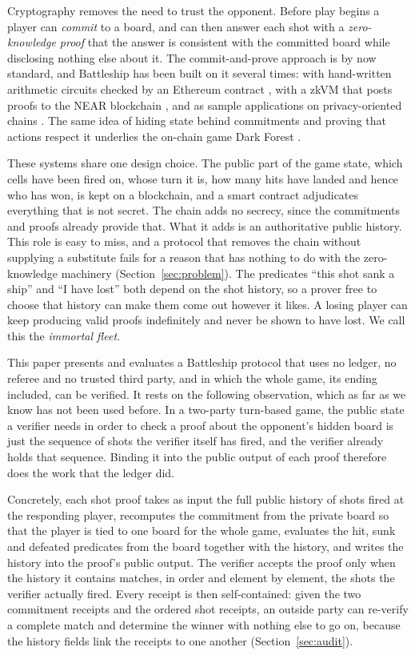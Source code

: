 \documentclass[11pt,a4paper]{article}
\begin{document}
Cryptography removes the need to trust the opponent. Before play begins a player
can \emph{commit} to a board, and can then answer each shot with a
\emph{zero-knowledge proof} that the answer is consistent with the committed
board while disclosing nothing else about it. The commit-and-prove approach is
by now standard, and Battleship has been built on it several times: with
hand-written arithmetic circuits checked by an Ethereum contract
\cite{battlezips,mit6857}, with a zkVM that posts proofs to the NEAR blockchain
\cite{risc0battleship}, and as sample applications on privacy-oriented chains
\cite{aleobattleship,minabattleship}. The same idea of hiding state behind
commitments and proving that actions respect it underlies the on-chain game
Dark Forest \cite{darkforest}.

These systems share one design choice. The public part of the game state, which
cells have been fired on, whose turn it is, how many hits have landed and hence
who has won, is kept on a blockchain, and a smart contract adjudicates
everything that is not secret. The chain adds no secrecy, since the commitments
and proofs already provide that. What it adds is an authoritative public
history. This role is easy to miss, and a protocol that removes the chain
without supplying a substitute fails for a reason that has nothing to do with
the zero-knowledge machinery (Section~\ref{sec:problem}). The predicates ``this
shot sank a ship'' and ``I have lost'' both depend on the shot history, so a
prover free to choose that history can make them come out however it likes. A
losing player can keep producing valid proofs indefinitely and never be shown
to have lost. We call this the \emph{immortal fleet}.

This paper presents and evaluates a Battleship protocol that uses no ledger, no
referee and no trusted third party, and in which the whole game, its ending
included, can be verified. It rests on the following observation, which as far
as we know has not been used before. In a two-party turn-based game, the public
state a verifier needs in order to check a proof about the opponent's hidden
board is just the sequence of shots the verifier itself has fired, and the
verifier already holds that sequence. Binding it into the public output of each
proof therefore does the work that the ledger did.

Concretely, each shot proof takes as input the full public history of shots
fired at the responding player, recomputes the commitment from the private
board so that the player is tied to one board for the whole game, evaluates the
hit, sunk and defeated predicates from the board together with the history, and
writes the history into the proof's public output. The verifier accepts the
proof only when the history it contains matches, in order and element by
element, the shots the verifier actually fired. Every receipt is then
self-contained: given the two commitment receipts and the ordered shot
receipts, an outside party can re-verify a complete match and determine the
winner with nothing else to go on, because the history fields link the receipts
to one another (Section~\ref{sec:audit}).
\end{document}
